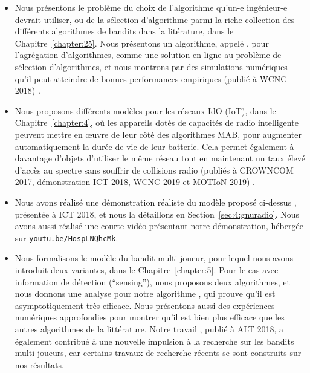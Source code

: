 \begin{resume_fr}
\begin{itemize}
    \item
    Nous présentons le problème du choix de l'algorithme qu'un-e ingénieur-e devrait utiliser, ou de la sélection d'algorithme parmi la riche collection des différents algorithmes de bandits dans la litérature, dans le Chapitre~\ref{chapter:25}.
    Nous présentons un algorithme, appelé \Aggr, pour l'agrégation d'algorithmes, comme une solution en ligne au problème de sélection d'algorithmes, et nous montrons par des simulations numériques qu'il peut atteindre de bonnes performances empiriques
    (publié à WCNC 2018) \cite{Besson2018WCNC}.

    \item
    Nous proposons différents modèles pour les réseaux IdO (IoT), dans le Chapitre~\ref{chapter:4}, où les appareils dotés de capacités de radio intelligente peuvent mettre en œuvre de leur côté des algorithmes MAB, pour augmenter automatiquement la durée de vie de leur batterie.
    Cela permet également à davantage d'objets d'utiliser le même réseau tout en maintenant un taux élevé d'accès au spectre sans souffrir de collisions radio
    (publiés à CROWNCOM 2017, démonstration ICT 2018, WCNC 2019 et MOTIoN 2019)
    \cite{Bonnefoi17,Besson2018ICT,Besson2019WCNC,Bonnefoi2019WCNC}.

    \item
    Nous avons réalisé une démonstration réaliste du modèle proposé ci-dessus \cite{Besson2018ICT,Besson2019WCNC}, présentée à ICT 2018, et nous la détaillons en Section~\ref{sec:4:gnuradio}. Nous avons aussi réalisé une courte vidéo présentant notre démonstration, hébergée sur \texttt{\href{https://youtu.be/HospLNQhcMk}{youtu.be/HospLNQhcMk}}.


    \item
    Nous formalisons le modèle du bandit multi-joueur, pour lequel nous avons introduit deux variantes, dans le Chapitre~\ref{chapter:5}.
    Pour le cas avec information de détection (``sensing''), nous proposons deux algorithmes, et nous donnons une analyse pour notre algorithme \MCTopM, qui prouve qu'il est asymptotiquement très efficace.
    Nous présentons aussi des expériences numériques approfondies pour montrer qu'il est bien plus efficace que les autres algorithmes de la littérature.
    Notre travail \cite{Besson2018ALT}, publié à ALT 2018, a également contribué à une nouvelle impulsion à la recherche sur les bandits multi-joueurs, car certains travaux de recherche récents se sont construits sur nos résultats.


\end{itemize}
\end{resume_fr}
